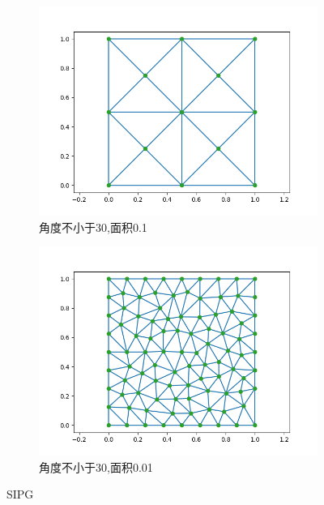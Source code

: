 \begin{figure}[H]
    \centering  
    \begin{subfigure}{0.5\textwidth}  
        \centering  
        \includegraphics[width=0.9\linewidth]{./pics/final/pq30a0_1e.png}  
        \caption{角度不小于30,面积0.1}  
    \end{subfigure}%
    \begin{subfigure}{0.5\textwidth}  
        \centering  
        \includegraphics[width=0.9\linewidth]{./pics/final/pq30a0_01e.png}  
        \caption{角度不小于30,面积0.01}
    \end{subfigure}  
    \caption{SIPG}  


\end{figure}
